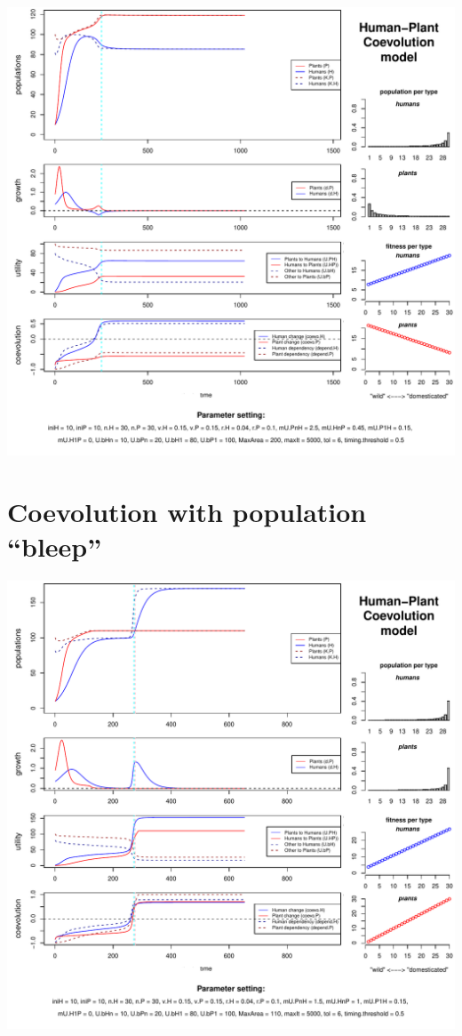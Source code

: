 \documentclass[]{book}
\begin{document}
\includegraphics{hpcModel-exploration_files/figure-latex/1_run.cult.without.dom-plot-1.pdf}

\newpage

\hypertarget{coevolution-with-population-bleep}{%
\section{Coevolution with population ``bleep''}\label{coevolution-with-population-bleep}}

\includegraphics{hpcModel-exploration_files/figure-latex/1_run.coevo.bleep-plot-1.pdf}
\end{document}
